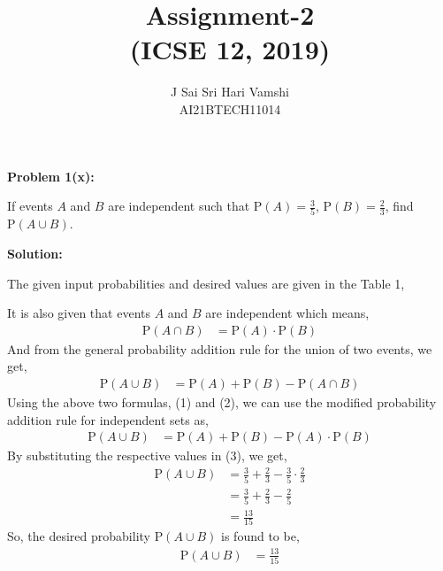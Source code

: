 \documentclass[journal,12pt,twocolumn]{article}\usepackage[margin=1.25 in]{geometry}
\title{\LARGE{\textbf{Assignment-2}\\(ICSE 12, 2019)}}
\author{\normalsize J Sai Sri Hari Vamshi\\ \footnotesize AI21BTECH11014}
\date{}
\providecommand{\pr}[1]{\ensuremath{\text{P}\left(#1\right)}}
\begin{document}
\maketitle
\begin{center}
    \textbf{\large Problem 1(x):}
\end{center}
\noindent If events $A$ and $B$ are independent such that $\pr{A} = \frac{3}{5}$, $\pr{B} = \frac{2}{3}$, find $\pr{A \cup B}$.

\begin{center}
    \textbf{\large Solution:}
\end{center}

\noindent The given input probabilities and desired values are given in the Table 1,
\begin{center}
\begin{table}[h!]
\label{table:table1}

\caption{}
\end{table}
\end{center}
\noindent It is also given that events $A$ and $B$ are independent which means,
\begin{align}
\pr{A \cap B} & = \pr A \cdot \pr B
\end{align}
\noindent And from the general probability addition rule for the union of two events, we get,
\begin{align}
\pr{A \cup B} & = \pr A + \pr B - \pr{A \cap B}
\end{align}
\noindent Using the above two formulas, (1) and (2), we can use the modified probability addition rule for independent sets as,
\begin{align}
\pr{A \cup B} & = \pr A + \pr B - \pr A \cdot \pr B
\end{align}
\noindent By substituting the respective values in (3), we get,
\begin{align*}
\pr{A \cup B} & = \frac{3}{5} + \frac{2}{3} - \frac{3}{5} \cdot \frac{2}{3} \\
& = \frac{3}{5} + \frac{2}{3} - \frac{2}{5}\\
& = \frac{13}{15}
\end{align*}
\noindent So, the desired probability $\pr{A \cup B}$ is found to be,
\begin{align*}
\pr{A \cup B} & = \frac{13}{15}
\end{align*}
\end{document}
